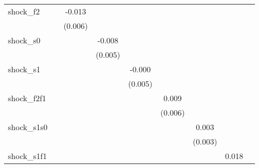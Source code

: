 {\begin{tabular}{l*{8}{c}}
\addlinespace
shock\_f2    &                     &      -0.013\sym{*}  &                     &                     &                     &                     &                     &                     \\
            &                     &     (0.006)         &                     &                     &                     &                     &                     &                     \\
\addlinespace
shock\_s0    &                     &                     &      -0.008         &                     &                     &                     &                     &                     \\
            &                     &                     &     (0.005)         &                     &                     &                     &                     &                     \\
\addlinespace
shock\_s1    &                     &                     &                     &      -0.000         &                     &                     &                     &                     \\
            &                     &                     &                     &     (0.005)         &                     &                     &                     &                     \\
\addlinespace
shock\_f2f1  &                     &                     &                     &                     &       0.009         &                     &                     &                     \\
            &                     &                     &                     &                     &     (0.006)         &                     &                     &                     \\
\addlinespace
shock\_s1s0  &                     &                     &                     &                     &                     &       0.003         &                     &                     \\
            &                     &                     &                     &                     &                     &     (0.003)         &                     &                     \\
\addlinespace
shock\_s1f1  &                     &                     &                     &                     &                     &                     &       0.018\sym{**} &                     \\

\end{tabular}}
